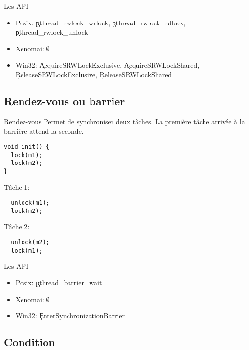 \begin{frame}[fragile=singleslide]{Les API}
  \begin{itemize} 
  \item  Posix:  \c{pthread_rwlock_wrlock}, \c{pthread_rwlock_rdlock},
    \c{pthread_rwlock_unlock}
  \item Xenomai: $\emptyset$
  \item  Win32: \c{AcquireSRWLockExclusive}, \c{AcquireSRWLockShared},
    \c{ReleaseSRWLockExclusive}, \c{ReleaseSRWLockShared}
  \end{itemize} 
\end{frame} 

\subsection{Rendez-vous ou barrier}
\begin{frame}[fragile]{Rendez-vous}
  Permet de synchroniser  deux tâches. La première tâche  arrivée à la
  barrière attend la seconde.
\begin{lstlisting} 
void init() {
  lock(m1);
  lock(m2);
}
\end{lstlisting}
Tâche 1:
\begin{lstlisting} 
  unlock(m1);
  lock(m2);
\end{lstlisting} 
Tâche 2:
\begin{lstlisting} 
  unlock(m2);
  lock(m1);
\end{lstlisting} 
\end{frame}

\begin{frame}[fragile=singleslide]{Les API}
  \begin{itemize} 
  \item Posix: \c{pthread_barrier_wait}
  \item Xenomai: $\emptyset$
  \item Win32: \c{EnterSynchronizationBarrier}
  \end{itemize} 
\end{frame} 

\subsection{Condition}

